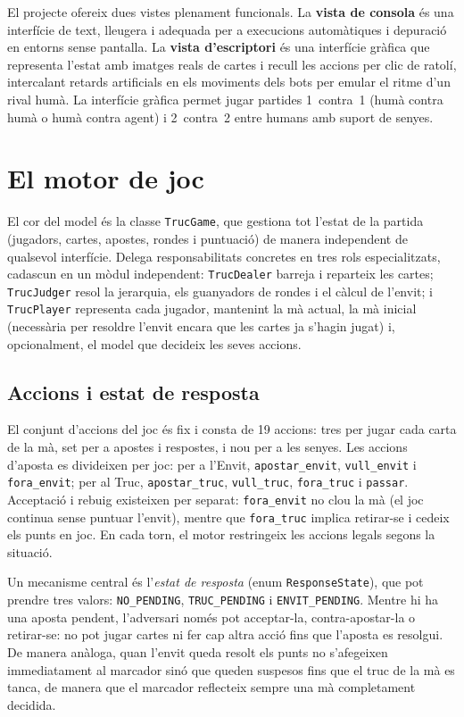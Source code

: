 El projecte ofereix dues vistes plenament funcionals. La \textbf{vista de consola}
és una interfície de text, lleugera i adequada per a execucions automàtiques i
depuració en entorns sense pantalla. La \textbf{vista d'escriptori} és una interfície
gràfica que representa l'estat amb imatges reals de cartes i recull les accions per
clic de ratolí, intercalant retards artificials en els moviments dels bots per
emular el ritme d'un rival humà. La interfície gràfica permet jugar partides
1~contra~1 (humà contra humà o humà contra agent) i 2~contra~2 entre humans amb
suport de senyes.

\section{El motor de joc}
\label{sec:motor}

El cor del model és la classe \texttt{TrucGame}, que
gestiona tot l'estat de la partida (jugadors, cartes, apostes, rondes i
puntuació) de manera independent de qualsevol interfície. Delega
responsabilitats concretes en tres rols especialitzats, cadascun en un mòdul independent: \texttt{TrucDealer} barreja i reparteix les
cartes; \texttt{TrucJudger} resol la jerarquia, els guanyadors de rondes i el
càlcul de l'envit; i \texttt{TrucPlayer} representa cada jugador, mantenint la
mà actual, la mà inicial (necessària per resoldre l'envit encara que les cartes
ja s'hagin jugat) i, opcionalment, el model que decideix les seves accions.

\subsection*{Accions i estat de resposta}

El conjunt d'accions del joc és fix i consta de 19 accions: tres per jugar
cada carta de la mà, set per a apostes i respostes, i nou per a les senyes.
Les accions d'aposta es divideixen per joc: per a l'Envit,
\texttt{apostar\_envit}, \texttt{vull\_envit} i \texttt{fora\_envit};
per al Truc, \texttt{apostar\_truc}, \texttt{vull\_truc},
\texttt{fora\_truc} i \texttt{passar}.
Acceptació i rebuig existeixen per separat: \texttt{fora\_envit} no clou la
mà (el joc continua sense puntuar l'envit), mentre que \texttt{fora\_truc}
implica retirar-se i cedeix els punts en joc. En cada torn, el motor
restringeix les accions legals segons la situació.

Un mecanisme central és l'\emph{estat de resposta}
(enum \texttt{ResponseState}), que pot prendre tres valors:
\texttt{NO\_PENDING}, \texttt{TRUC\_PENDING} i \texttt{ENVIT\_PENDING}. Mentre hi ha una aposta pendent, l'adversari
només pot acceptar-la, contra-apostar-la o retirar-se: no pot jugar cartes ni fer
cap altra acció fins que l'aposta es resolgui. De manera anàloga, quan l'envit
queda resolt els punts no s'afegeixen immediatament al marcador sinó que queden
suspesos fins que el truc de la mà es tanca, de manera que el marcador reflecteix
sempre una mà completament decidida.

